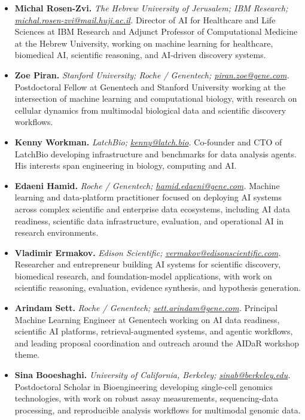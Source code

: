 \documentclass[10pt]{article}
\begin{document}
\begin{itemize}
    \item \textbf{Michal Rosen-Zvi.}
\textit{The Hebrew University of Jerusalem; IBM Research; 
\href{mailto:michal.rosen-zvi@mail.huji.ac.il}{michal.rosen-zvi@mail.huji.ac.il}.}
Director of AI for Healthcare and Life Sciences at IBM Research and Adjunct Professor of Computational Medicine at the Hebrew University, working on machine learning for healthcare, biomedical AI, scientific reasoning, and AI-driven discovery systems.

\item \textbf{Zoe Piran.}
\textit{Stanford University; Roche / Genentech;
\href{mailto:piran.zoe@gene.com}{piran.zoe@gene.com}.}
Postdoctoral Fellow at Genentech and Stanford University working at the intersection of machine learning and computational biology, with research on cellular dynamics from multimodal biological data and scientific discovery workflows.

\item \textbf{Kenny Workman.}
\textit{LatchBio;
\href{mailto:kenny@latch.bio}{kenny@latch.bio}.}
Co-founder and CTO of LatchBio developing infrastructure and benchmarks for data analysis agents. His interests span engineering in biology, computing and AI.

\item \textbf{Edaeni Hamid.}
\textit{Roche / Genentech;
\href{mailto:hamid.edaeni@gene.com}{hamid.edaeni@gene.com}.}
Machine learning and data-platform practitioner focused on deploying AI systems across complex scientific and enterprise data ecosystems, including AI data readiness, scientific data infrastructure, evaluation, and operational AI in research environments.

\item \textbf{Vladimir Ermakov.}
\textit{Edison Scientific;
\href{mailto:vermakov@edisonscientific.com}{vermakov@edisonscientific.com}.}
Researcher and entrepreneur building AI systems for scientific discovery, biomedical research, and foundation-model applications, with work on scientific reasoning, evaluation, evidence synthesis, and hypothesis generation.

\item \textbf{Arindam Sett.}
\textit{Roche / Genentech;
\href{mailto:sett.arindam@gene.com}{sett.arindam@gene.com}.}
Principal Machine Learning Engineer at Genentech working on AI data readiness, scientific AI platforms, retrieval-augmented systems, and agentic workflows, and leading proposal coordination and outreach around the AIDaR workshop theme.

\item \textbf{Sina Booeshaghi.}
\textit{University of California, Berkeley;
\href{mailto:sinab@berkeley.edu}{sinab@berkeley.edu}.}
Postdoctoral Scholar in Bioengineering developing single-cell genomics technologies, with work on robust assay measurements, sequencing-data processing, and reproducible analysis workflows for multimodal genomic data.


\end{itemize}
\end{document}
